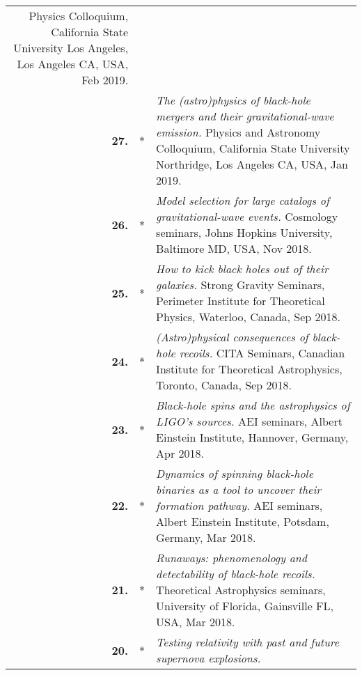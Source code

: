 \documentclass[11pt,letterpaper,sans]{moderncv}   %
\begin{document}
{\begin{longtable}{rp{0.4cm}p{15.8cm}}
\newline{} 
Physics Colloquium, California State University Los Angeles, Los Angeles CA, USA, Feb 2019.
\vspace{0.05cm}\\
%
\textbf{27.} & *& \textit{The (astro)physics of black-hole mergers and their gravitational-wave emission.}
\newline{} 
Physics and Astronomy Colloquium, California State University Northridge, Los Angeles CA, USA, Jan 2019.
\vspace{0.05cm}\\
%
\textbf{26.} & *& \textit{Model selection for large catalogs of gravitational-wave events.}
\newline{} 
Cosmology seminars, Johns Hopkins University, Baltimore MD, USA, Nov 2018.
\vspace{0.05cm}\\
%
\textbf{25.} & *& \textit{How to kick black holes out of their galaxies.}
\newline{} 
Strong Gravity Seminars, Perimeter Institute for Theoretical Physics, Waterloo, Canada, Sep 2018.
\vspace{0.05cm}\\
%
\textbf{24.} & *& \textit{(Astro)physical consequences of black-hole recoils.}
\newline{} 
CITA Seminars, Canadian Institute for Theoretical Astrophysics, Toronto, Canada, Sep 2018.
\vspace{0.05cm}\\
%
\textbf{23.} & *& \textit{Black-hole spins and the astrophysics of LIGO's sources.}
\newline{} 
AEI seminars, Albert Einstein Institute, Hannover, Germany, Apr 2018.
\vspace{0.05cm}\\
%
\textbf{22.} & *& \textit{Dynamics of spinning black-hole binaries as a tool to uncover their formation pathway.}
\newline{} 
AEI seminars, Albert Einstein Institute, Potsdam, Germany, Mar 2018.
\vspace{0.05cm}\\
%
\textbf{21.} & *& \textit{Runaways: phenomenology and detectability of black-hole recoils.}
\newline{} 
Theoretical Astrophysics seminars, University of Florida, Gainsville FL, USA, Mar 2018.
\vspace{0.05cm}\\
%
\textbf{20.} & *& \textit{Testing relativity with past and future supernova explosions.}

\end{longtable}}
\end{document}
